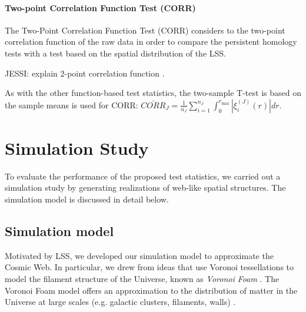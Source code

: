 \documentclass[12pt]{article}
\begin{document}
\paragraph{Two-point Correlation Function Test (CORR)} 
The Two-Point Correlation Function Test (CORR) considers to the two-point correlation function of the raw data in order to compare the persistent homology tests with a test based on the spatial distribution of the LSS.  



{\color{blue}  JESSI:  explain 2-point correlation function \cite{Martinez:2001aa}.}


As with the other function-based test statistics, the two-sample T-test is based on the sample means is used for CORR:
$
\bar{CORR}_J = \frac{1}{n_J}\sum_{i = 1}^{n_J} \int_{0}^{r_{\max}} | \xi_i^{(J)}(r) | dr.
$






\section{Simulation Study}
\label{sec:simulation}

To evaluate the performance of the proposed test statistics, we carried out a simulation study by generating realizations of web-like spatial structures.  The simulation model is discussed in detail below.

\subsection{Simulation model} \label{sec:sim_model} %
Motivated by LSS, we developed our simulation model to approximate the Cosmic Web. In particular, we drew from ideas that use Voronoi tessellations to model the filament structure of the Universe, known as \emph{Voronoi Foam} \citep{icke1987fragmenting, icke1991galaxy, van2007voronoi}.  The Voronoi Foam model offers an approximation to the distribution of matter in the Universe at large scales (e.g. galactic clusters, filaments, walls) \citep{icke1991galaxy}.
\end{document}
